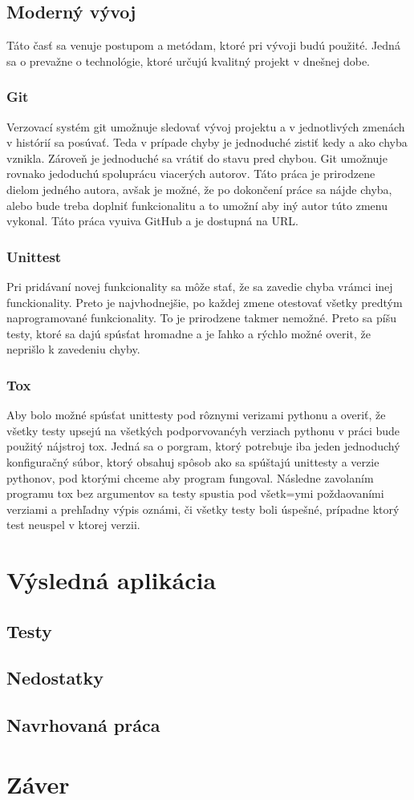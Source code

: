 \section{Moderný vývoj}
Táto časť sa venuje postupom a metódam, ktoré pri vývoji budú použité. Jedná sa
o prevažne o technológie, ktoré určujú kvalitný projekt v dnešnej dobe.

\subsection{Git}
Verzovací systém git umožnuje sledovať vývoj projektu a v jednotlivých zmenách
v histórií sa posúvať. Teda v prípade chyby je jednoduché zistiť kedy a ako chyba
vznikla. Zároveň je jednoduché sa vrátiť do stavu pred chybou.
Git umožnuje rovnako jedoduchú spoluprácu viacerých autorov. Táto práca je
prirodzene dielom jedného autora, avšak je možné, že po dokončení práce sa nájde
chyba, alebo bude treba doplniť funkcionalitu a to umožní aby iný autor túto zmenu
vykonal.
Táto práca vyuiva GitHub a je dostupná na URL.

\subsection{Unittest}
Pri pridávaní novej funkcionality sa môže stať, že sa zavedie chyba vrámci inej
funckionality. Preto je najvhodnejšie, po každej zmene otestovať všetky predtým
naprogramované funkcionality. To je prirodzene takmer nemožné. Preto sa píšu testy,
ktoré sa dajú spúsťat hromadne a je ľahko a rýchlo možné overit, že neprišlo k
zavedeniu chyby.

\subsection{Tox}
Aby bolo možné spúsťat unittesty pod rôznymi verizami pythonu a overiť, že všetky testy
upsejú na všetkých podporvovanćyh verziach pythonu v práci bude použitý nájstroj tox.
Jedná sa o porgram, ktorý potrebuje iba jeden jednoduchý konfiguračný súbor, ktorý
obsahuj spôsob ako sa spúštajú unittesty a verzie pythonov, pod ktorými chceme
aby program fungoval. Následne zavolaním programu tox bez argumentov sa testy
spustia pod všetk=ymi poždaovaními verziami a prehľadny výpis oznámi, či všetky
testy boli úspešné, prípadne ktorý test neuspel v ktorej verzii.

\chapter{Výsledná aplikácia}

\section{Testy}

\section{Nedostatky}

\section{Navrhovaná práca}

\chapter{Záver}

